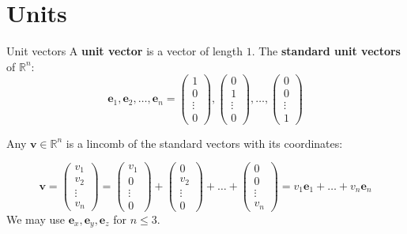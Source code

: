 \documentclass[10pt]{beamer}
\begin{document}
\section{Units}
\begin{frame}{Unit vectors}
    A \textbf{unit vector} is a vector of length $1$. The \textbf{standard unit vectors} of $\mathbb R^n$:
    $$
    \mathbf e_1, \mathbf e_2, \dots, \mathbf e_n = \begin{pmatrix} 1 \\ 0 \\ \vdots \\ 0\end{pmatrix},
    \begin{pmatrix} 0 \\ 1 \\ \vdots \\ 0\end{pmatrix},
    \dots,
    \begin{pmatrix} 0 \\ 0 \\ \vdots \\ 1\end{pmatrix}
    $$

    Any $\mathbf v \in \mathbb R^n$ is a lincomb of the standard vectors with its coordinates:

    $$
    \mathbf v = \begin{pmatrix}
        v_1 \\ v_2 \\ \vdots \\ v_n
    \end{pmatrix} = 
    \begin{pmatrix} v_1 \\ 0 \\ \vdots \\ 0\end{pmatrix} +
    \begin{pmatrix} 0 \\ v_2 \\ \vdots \\ 0\end{pmatrix} +
    \dots +
    \begin{pmatrix} 0 \\ 0 \\ \vdots \\ v_n\end{pmatrix} = v_1 \mathbf e_1 + \dots + v_n \mathbf e_n
    $$
    We may use $\mathbf e_x, \mathbf e_y, \mathbf e_z$ for $n \leq 3$.
\end{frame}
\end{document}
